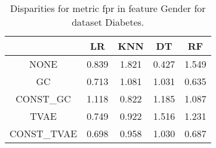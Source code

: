 \begin{table}
\caption{Disparities for metric fpr in feature Gender for dataset Diabetes.}
\label{tab:disp-DIABETES-Gender-fpr}
\begin{tabular}{ccccc}
\toprule
 & LR & KNN & DT & RF \\
\midrule
NONE & 0.839 & 1.821 & 0.427 & 1.549 \\
GC & 0.713 & 1.081 & 1.031 & 0.635 \\
CONST\_GC & 1.118 & 0.822 & 1.185 & 1.087 \\
TVAE & 0.749 & 0.922 & 1.516 & 1.231 \\
CONST\_TVAE & 0.698 & 0.958 & 1.030 & 0.687 \\
\bottomrule
\end{tabular}
\end{table}
